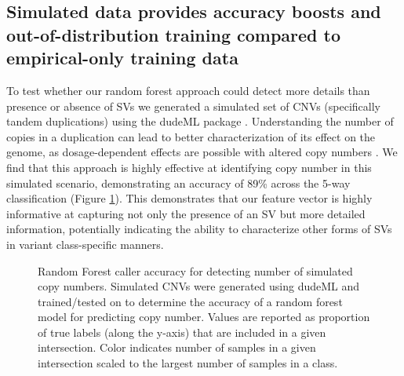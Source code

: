 \subsection{Simulated data provides accuracy boosts and out-of-distribution training compared to empirical-only training data}

To test whether our random forest approach could detect more details than presence or absence of SVs we generated a simulated set of CNVs (specifically tandem duplications) using the dudeML package \cite{hillDeepLearningApproach2019}. Understanding the number of copies in a duplication can lead to better characterization of its effect on the genome, as dosage-dependent effects are possible with altered copy numbers \cite{fengzhangCopyNumberVariation2009}. We find that this approach is highly effective at identifying copy number in this simulated scenario, demonstrating an accuracy of 89\% across the 5-way classification (Figure \ref{fig:cnvs}). This demonstrates that our feature vector is highly informative at capturing not only the presence of an SV but more detailed information, potentially indicating the ability to characterize other forms of SVs in variant class-specific manners.

\begin{figure}
    \centering
    \caption[Random Forest caller accuracy for detecting number of simulated copy numbers.]{Random Forest caller accuracy for detecting number of simulated copy numbers. Simulated CNVs were generated using dudeML and trained/tested on to determine the accuracy of a random forest model for predicting copy number. Values are reported as proportion of true labels (along the y-axis) that are included in a given intersection. Color indicates number of samples in a given intersection scaled to the largest number of samples in a class.}
    \label{fig:cnvs}
\end{figure}


